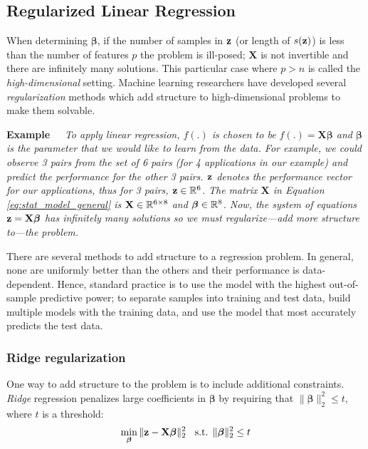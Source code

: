 \subsection{Regularized Linear Regression}
\label{sec:est:regularized_lin_reg}
When determining $\boldsymbol{\boldsymbol{\beta}}$, if the number of
samples in $\mathbf{z}$ (or length of $s(\mathbf{z})$) is less than the number of
features $p$ the problem is ill-posed; \ie $\mathbf{X}$ is not
invertible and there are infinitely many solutions. This particular
case where $p>n$ is called the \textit{high-dimensional} setting.
Machine learning researchers have developed several
\emph{regularization} methods which add structure to high-dimensional
problems to make them solvable.


\noindent \textbf{Example~~}\textit{ To apply linear regression,
  $f(.)$ is chosen to be $f(.) = \mathbf{X}\boldsymbol{\beta}$ and
  $\boldsymbol{\beta}$ is the parameter that we would like to learn
  from the data. For example, we could observe 3 pairs from the set of
  6 pairs (for 4 applications in our example) and predict the
  performance for the other 3 pairs. $\mathbf{z}$ denotes the performance
  vector for our applications, thus for 3 pairs, $\mathbf{z} \in \mathbb{R}^{6}$. The
  matrix $\mathbf{X}$ in Equation \eqref{eq:stat_model_general} is
  $\mathbf{X} \in \mathbb{R}^{6 \times 8}$ and $\boldsymbol{\beta} \in
  \mathbb{R}^{8}$.  Now, the system of equations $\mathbf{z} =
  \mathbf{X}\boldsymbol{\beta}$ has infinitely many solutions so we
  must \emph{regularize}---\ie add more structure to---the problem.
}

There are several methods to add structure to a regression problem.
In general, none are uniformly better than the others and their
performance is data-dependent. Hence, standard practice is to use the
model with the highest out-of-sample predictive power; \ie to separate
samples into training and test data, build multiple models with the
training data, and use the model that most accurately predicts the
test data.

\subsubsection{Ridge regularization}
One way to add structure to the problem is to include additional
constraints.  \emph{Ridge} regression penalizes large coefficients in
$\boldsymbol{\beta}$ \cite{hoerl1988ridge} by requiring that
$\|\boldsymbol{\beta}\|^2_2 \leq t$, where $t$ is a threshold:
\begin{equation}
\label{eq:ridge}
\min_{\boldsymbol{\beta}} \|\mathbf{z} - \mathbf{X}\boldsymbol{\beta} \|^2_2 \;\; \text{  s.t.  } \| \boldsymbol{\beta} \|^2_2 \leq t
\end{equation}

